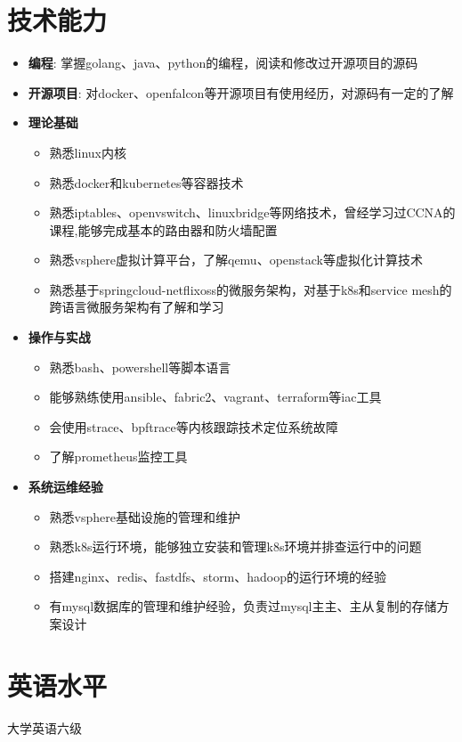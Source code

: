 \documentclass{resume}
\begin{document}
\section{技术能力}
\begin{itemize}[parsep=0.2ex]
  \item \textbf{编程}: 掌握golang、java、python的编程，阅读和修改过开源项目的源码
  \item \textbf{开源项目}: 对docker、openfalcon等开源项目有使用经历，对源码有一定的了解
  \item \textbf{理论基础}
    \begin{itemize}
      \item 熟悉linux内核
      \item 熟悉docker和kubernetes等容器技术
      \item 熟悉iptables、openvswitch、linuxbridge等网络技术，曾经学习过CCNA的课程,能够完成基本的路由器和防火墙配置
      \item 熟悉vsphere虚拟计算平台，了解qemu、openstack等虚拟化计算技术
      \item 熟悉基于springcloud-netflixoss的微服务架构，对基于k8s和service mesh的跨语言微服务架构有了解和学习
    \end{itemize}
  \item \textbf{操作与实战}
    \begin{itemize}
      \item 熟悉bash、powershell等脚本语言
      \item 能够熟练使用ansible、fabric2、vagrant、terraform等iac工具
      \item 会使用strace、bpftrace等内核跟踪技术定位系统故障
      \item 了解prometheus监控工具
    \end{itemize}
  \item \textbf{系统运维经验}
    \begin{itemize}
      \item 熟悉vsphere基础设施的管理和维护
      \item 熟悉k8s运行环境，能够独立安装和管理k8s环境并排查运行中的问题
      \item 搭建nginx、redis、fastdfs、storm、hadoop的运行环境的经验
      \item 有mysql数据库的管理和维护经验，负责过mysql主主、主从复制的存储方案设计
    \end{itemize}
\end{itemize}

\section{英语水平}
大学英语六级
\end{document}
